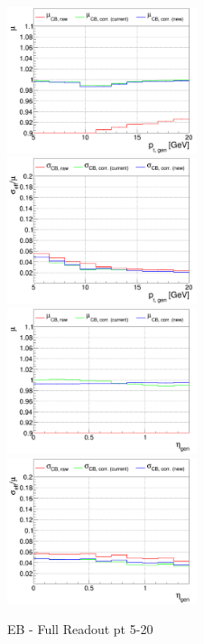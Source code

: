\begin{figure}
\includegraphics[width=0.495\textwidth]{./ECAL_plots/plotsNOPU/EB/FULL/pdf/GENPT/EBFULL_GENPT_0005_0020_MuOverBins.pdf}
\includegraphics[width=0.495\textwidth]{./ECAL_plots/plotsNOPU/EB/FULL/pdf/GENPT/EBFULL_GENPT_0005_0020_EffSigmaOverBins.pdf}
\includegraphics[width=0.495\textwidth]{./ECAL_plots/plotsNOPU/EB/FULL/pdf/GENETA/EBFULL_GENETA_0005_0020_MuOverBins.pdf}
\includegraphics[width=0.495\textwidth]{./ECAL_plots/plotsPU/EB/FULL/pdf/GENETA/EBFULL_GENETA_0005_0020_EffSigmaOverBins.pdf}
\caption{EB - Full Readout pt 5-20}
\end{figure}


